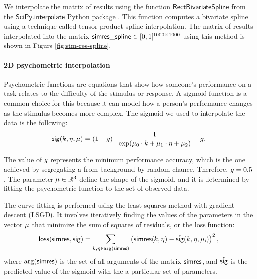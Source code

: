 We interpolate the matrix of results using the function $\mathsf{RectBivariateSpline}$ from the $\mathsf{SciPy.interpolate}$ Python package \cite{SciPy:RectBivariateSpline}. This function computes a bivariate spline using a technique called tensor product spline interpolation. 
The matrix of results interpolated into the matrix $\mathsf{simres\_spline} \in [0, 1]^{1000 \times 1000}$ using this method is shown in Figure \ref{fig:sim-res-spline}.

\paragraph{2D psychometric interpolation}

Psychometric functions are equations that show how someone's performance on a task relates to the difficulty of the stimulus or response. A sigmoid function is a common choice for this because it can model how a person's performance changes as the stimulus becomes more complex. The sigmoid we used to interpolate the data is the following:
\begin{equation}
    \mathsf{sig}(k, \eta, \mu) = (1 - g) \cdot \frac{1}{
    \exp(\mu_0 \cdot k + \mu_1 \cdot \eta + \mu_2)
    } + g.
\end{equation}

The value of $g$ represents the minimum performance accuracy, which is the one achieved by segregating a \stimfig{} from background by random chance. Therefore, $g = 0.5$.
The parameter $\mu \in \mathbb{R}^3$ define the shape of the sigmoid, and it is determined by fitting the psychometric function to the set of observed data. 

The curve fitting is performed using the least squares method with gradient descent (LSGD). It involves iteratively finding the values of the parameters in the vector $\mu$ that minimize the sum of squares of residuals, or the loss function:
\begin{equation}
    \mathsf{loss}(\mathsf{simres}, \mathsf{sig}) = \sum_{k, \eta \in \arg (\mathsf{simres})} 
    \left(
        \mathsf{simres}(k, \eta) - \hat{\mathsf{sig}}(k, \eta, \mu_i)
    \right)^2,
\end{equation}
where $\arg (\mathsf{simres})$ is the set of all arguments of the matrix $\mathsf{simres}$, and $\hat{\mathsf{sig}}$ is the predicted value of the sigmoid with the a particular set of parameters.

